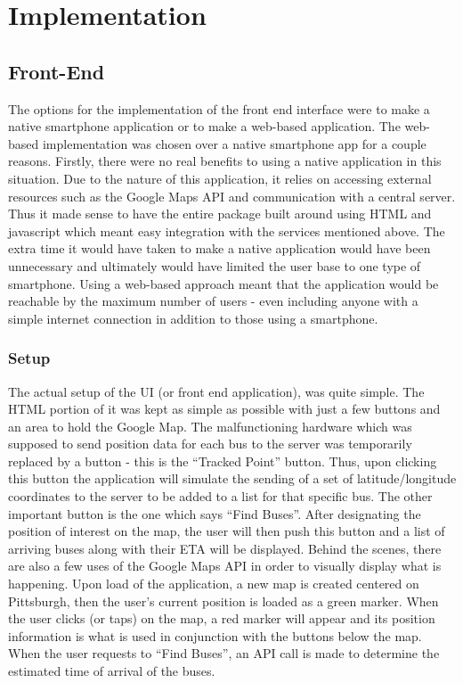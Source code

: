 \documentclass[pageno]{jpaper}
\begin{document}
\section{Implementation}
\subsection{Front-End}

The options for the implementation of the front end interface were to make a 
native smartphone application or to make a web-based application. The web-based 
implementation was chosen over a native smartphone app for a couple reasons. Firstly, 
there were no real benefits to using a native application in this situation. Due to the 
nature of this application, it relies on accessing external resources such as the Google 
Maps API and communication with a central server. Thus it made sense to have the 
entire package built around using HTML and javascript which meant easy integration 
with the services mentioned above. The extra time it would have taken to make a native 
application would have been unnecessary and ultimately would have limited the user 
base to one type of smartphone. Using a web-based approach meant that the 
application would be reachable by the maximum number of users - even including 
anyone with a simple internet connection in addition to those using a smartphone.
\subsubsection{Setup}
The actual setup of the UI (or front end application), was quite simple. The HTML
portion of it was kept as simple as possible with just a few buttons and an area to hold 
the Google Map. The malfunctioning hardware which was supposed to send position 
data for each bus to the server was temporarily replaced by a button - this is the 
“Tracked Point” button. Thus, upon clicking this button the application will simulate the 
sending of a set of latitude/longitude coordinates to the server to be added to a list for 
that specific bus. The other important button is the one which says “Find Buses”. After 
designating the position of interest on the map, the user will then push this button and a 
list of arriving buses along with their ETA will be displayed. Behind the scenes, there 
are also a few uses of the Google Maps API in order to visually display what is 
happening. Upon load of the application, a new map is created centered on Pittsburgh, 
then the user’s current position is loaded as a green marker. When the user clicks (or 
taps) on the map, a red marker will appear and its position information is what is used in 
conjunction with the buttons below the map. When the user requests to “Find Buses”, 
an API call is made to determine the estimated time of arrival of the buses.
\end{document}
